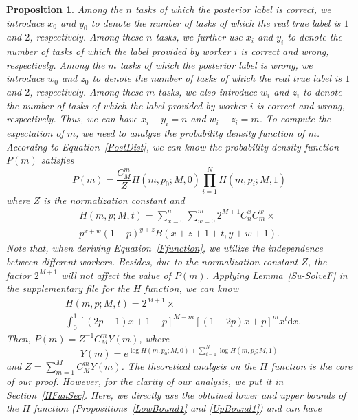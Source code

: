 \documentclass{article}
\makeatletter
\newtheorem{proposition}[theorem]{Proposition}
\renewenvironment{proof}[1][\proofname]{\par
  \vspace{-\topsep}%
  \pushQED{\qed}%
  \normalfont
  \topsep0pt \partopsep0pt %
  \trivlist
  \item[\hskip\labelsep
        \itshape
    #1\@addpunct{.}]\ignorespaces
}{%
  \popQED\endtrivlist\@endpefalse
  \addvspace{0pt plus 0pt} %
}
\makeatother
\begin{document}
\begin{proposition}
\begin{proof}
Among the $n$ tasks of which the posterior label is correct, we introduce $x_0$ and $y_0$ to denote the number of tasks of which the real true label is $1$ and $2$, respectively.
Among these $n$ tasks, we further use $x_i$ and $y_i$ to denote the number of tasks of which the label provided by worker $i$ is correct and wrong, respectively.
Among the $m$ tasks of which the posterior label is wrong, we introduce $w_0$ and $z_0$ to denote the number of tasks of which the real true label is $1$ and $2$, respectively.
Among these $m$ tasks, we also introduce $w_i$ and $z_i$ to denote the number of tasks of which the label provided by worker $i$ is correct and wrong, respectively.
Thus, we can have $x_i+y_i=n$ and $w_i+z_i=m$.
To compute the expectation of $m$, we need to analyze the probability density function of $m$. According to Equation~\ref{PostDist}, we can know the probability density function $P(m)$ satisfies
\begin{equation}
\label{PDist}
P(m) = \frac{C_{M}^{m}}{Z}H(m, p_0; M, 0)\prod_{i=1}^{N}H(m, p_i; M, 1)
\end{equation}
where $Z$ is the normalization constant and
\begin{equation}
\label{Ffunction}
\begin{split}
H(m,p;M,t)={\sum}_{x=0}^{n}{\sum}_{w=0}^{m} 2^{M+1}C_{n}^{x}C_{m}^{w}\times\\
p^{x+w}(1-p)^{y+z}B(x+z+1+t,y+w+1).
\end{split}
\end{equation}
Note that, when deriving Equation~\ref{Ffunction}, we utilize the independence between different workers. Besides, due to the normalization constant $Z$, the factor $2^{M+1}$ will not affect the value of $P(m)$.
Applying Lemma~\ref{Su-SolveF} in the supplementary file for the $H$ function, we can know
\begin{align}
&H(m,p;M,t)=2^{M+1}\times \label{Hfunction}\\
&\int_{0}^{1}[(2p-1)x+1-p]^{M-m}[(1-2p)x+p]^{m}x^t\mathrm{d}x. \nonumber
\end{align}
Then, $P(m)=Z^{-1}C_{M}^{m}Y(m)$, where
\begin{equation}
\label{PDist}
Y(m) =e^{\log H(m,p_0;M,0)+\sum_{i=1}^{N}\log H(m,p_i;M,1)}
\end{equation}
and $Z=\sum_{m=1}^{M}C_{M}^{m}Y(m)$. 
The theoretical analysis on the $H$ function is the core of our proof. However, for the clarity of our analysis, we put it in Section~\ref{HFunSec}.
Here, we directly use the obtained lower and upper bounds of the $H$ function (Propositions~\ref{LowBound1} and \ref{UpBound1}) and can have

\end{proof}
\end{proposition}
\end{document}
